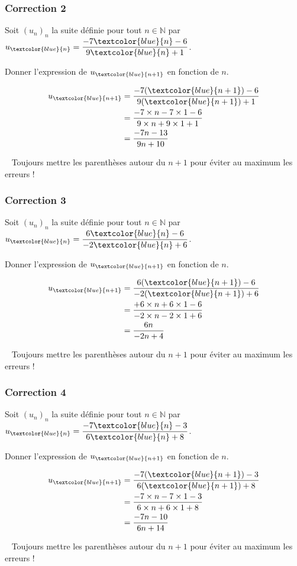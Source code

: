\documentclass[15pt, mathserif]{beamer}
\newcommand{\N}{\mathbb{N}}			%
\begin{document}
\begin{frame}
\vspace{-10mm}
	\frametitle{Correction 2}
\vspace*{1cm} 
 Soit $(u_n)_n$ la suite définie pour tout $n \in \N$ par $u_{\textcolor{blue}{n}}=\dfrac{-7\textcolor{blue}{n}-6}{9\textcolor{blue}{n}+1}$. 
 
 Donner l'expression de $u_{\textcolor{blue}{n+1}}$ en fonction de $n$. 
 
 \begin{align*} 
 u_{\textcolor{blue}{n+1}} 
 &= \dfrac{-7(\textcolor{blue}{n+1})-6}{9(\textcolor{blue}{n+1})+1}\\ 
  &= \dfrac{-7\times n-7\times 1-6}{9\times n+9\times 1 +1}\\ 
 &= \dfrac{-7n-13}{9n+10} 
 \end{align*} 
 
 \bcattention ~ Toujours mettre les parenthèses autour du $n+1$ pour éviter au maximum les erreurs ! 
\end{frame}


\begin{frame}
\vspace{-10mm}
	\frametitle{Correction 3}
\vspace*{1cm} 
 Soit $(u_n)_n$ la suite définie pour tout $n \in \N$ par $u_{\textcolor{blue}{n}}=\dfrac{6\textcolor{blue}{n}-6}{-2\textcolor{blue}{n}+6}$. 
 
 Donner l'expression de $u_{\textcolor{blue}{n+1}}$ en fonction de $n$. 
 
 \begin{align*} 
 u_{\textcolor{blue}{n+1}} 
 &= \dfrac{6(\textcolor{blue}{n+1})-6}{-2(\textcolor{blue}{n+1})+6}\\ 
  &= \dfrac{+6\times n+6\times 1-6}{-2\times n-2\times 1 +6}\\ 
 &= \dfrac{6n}{-2n+4} 
 \end{align*} 
 
 \bcattention ~ Toujours mettre les parenthèses autour du $n+1$ pour éviter au maximum les erreurs ! 
\end{frame}


\begin{frame}
\vspace{-10mm}
	\frametitle{Correction 4}
\vspace*{1cm} 
 Soit $(u_n)_n$ la suite définie pour tout $n \in \N$ par $u_{\textcolor{blue}{n}}=\dfrac{-7\textcolor{blue}{n}-3}{6\textcolor{blue}{n}+8}$. 
 
 Donner l'expression de $u_{\textcolor{blue}{n+1}}$ en fonction de $n$. 
 
 \begin{align*} 
 u_{\textcolor{blue}{n+1}} 
 &= \dfrac{-7(\textcolor{blue}{n+1})-3}{6(\textcolor{blue}{n+1})+8}\\ 
  &= \dfrac{-7\times n-7\times 1-3}{6\times n+6\times 1 +8}\\ 
 &= \dfrac{-7n-10}{6n+14} 
 \end{align*} 
 
 \bcattention ~ Toujours mettre les parenthèses autour du $n+1$ pour éviter au maximum les erreurs ! 
\end{frame}
\end{document}
